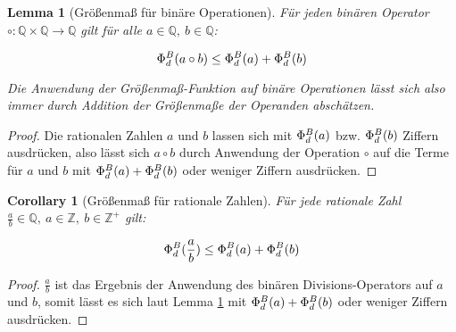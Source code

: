 \documentclass{article}
\newtheorem{corollary}{Corollary}[theorem]
\newtheorem{lemma}[theorem]{Lemma}
\theoremstyle{nonumberplain}
\newtheorem{proof}{Beweis}
\begin{document}
\begin{lemma}[Größenmaß für binäre Operationen]\label{lemma:phi_binary}
    Für jeden binären Operator \(\circ : \mathbb{Q} \times \mathbb{Q} \to \mathbb{Q}\) gilt für alle \(a\in\mathbb{Q},\ b\in\mathbb{Q}\):

    \[\Phi_{d}^{B}(a \circ b) \leq \Phi_{d}^{B}(a) + \Phi_{d}^{B}(b)\]

    Die Anwendung der Größenmaß-Funktion auf binäre Operationen lässt sich also immer durch Addition der Größenmaße der Operanden abschätzen.
\end{lemma}
\begin{proof}
    Die rationalen Zahlen \(a\) und \(b\) lassen sich mit \(\Phi_{d}^{B}(a)\) bzw. \(\Phi_{d}^{B}(b)\) Ziffern ausdrücken, also lässt sich \(a \circ b\) durch Anwendung der Operation \(\circ\) auf die Terme für \(a\) und \(b\) mit \(\Phi_{d}^{B}(a) + \Phi_{d}^{B}(b)\) oder weniger Ziffern ausdrücken.
\end{proof}

\begin{corollary}[Größenmaß für rationale Zahlen]\label{corollary:phi_rational}
    Für jede rationale Zahl \(\frac{a}{b}\in\mathbb{Q},\ a\in\mathbb{Z},\ b\in\mathbb{Z}^+\) gilt:

    \[\Phi_{d}^{B}(\frac{a}{b}) \leq \Phi_{d}^{B}(a) + \Phi_{d}^{B}(b)\]
\end{corollary}
\begin{proof}
    \(\frac{a}{b}\) ist das Ergebnis der Anwendung des binären Divisions-Operators auf \(a\) und \(b\), somit lässt es sich laut Lemma \ref{lemma:phi_binary} mit \(\Phi_{d}^{B}(a) + \Phi_{d}^{B}(b)\) oder weniger Ziffern ausdrücken.
\end{proof}
\end{document}
